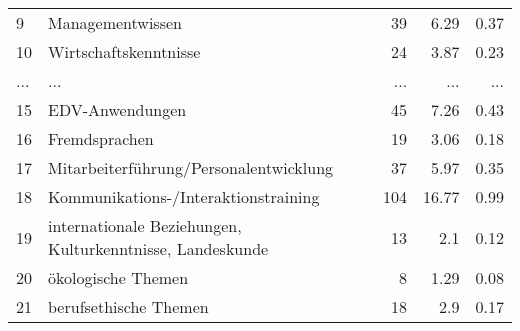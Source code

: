 \begin{longtable}{lXrrr}
        9 & \multicolumn{1}{X}{Managementwissen} & %
          \num{39} &
          \num[round-mode=places,round-precision=2]{6,29} &
          \num[round-mode=places,round-precision=2]{0,37} \\
        10 & \multicolumn{1}{X}{Wirtschaftskenntnisse} & %
          \num{24} &
          \num[round-mode=places,round-precision=2]{3,87} &
          \num[round-mode=places,round-precision=2]{0,23} \\
       ... & ... & ... & ... & ... \\
        15 & \multicolumn{1}{X}{EDV-Anwendungen} & %
          \num{45} &
          \num[round-mode=places,round-precision=2]{7,26} &
          \num[round-mode=places,round-precision=2]{0,43} \\

        16 & \multicolumn{1}{X}{Fremdsprachen} & %
          \num{19} &
          \num[round-mode=places,round-precision=2]{3,06} &
          \num[round-mode=places,round-precision=2]{0,18} \\

        17 & \multicolumn{1}{X}{Mitarbeiterführung/Personalentwicklung} & %
          \num{37} &
          \num[round-mode=places,round-precision=2]{5,97} &
          \num[round-mode=places,round-precision=2]{0,35} \\

        18 & \multicolumn{1}{X}{Kommunikations-/Interaktionstraining} & %
          \num{104} &
          \num[round-mode=places,round-precision=2]{16,77} &
          \num[round-mode=places,round-precision=2]{0,99} \\

        19 & \multicolumn{1}{X}{internationale Beziehungen, Kulturkenntnisse, Landeskunde} & %
          \num{13} &
          \num[round-mode=places,round-precision=2]{2,1} &
          \num[round-mode=places,round-precision=2]{0,12} \\

        20 & \multicolumn{1}{X}{ökologische Themen} & %
          \num{8} &
          \num[round-mode=places,round-precision=2]{1,29} &
          \num[round-mode=places,round-precision=2]{0,08} \\

        21 & \multicolumn{1}{X}{berufsethische Themen} & %
          \num{18} &
          \num[round-mode=places,round-precision=2]{2,9} &
          \num[round-mode=places,round-precision=2]{0,17} \\


\end{longtable}
